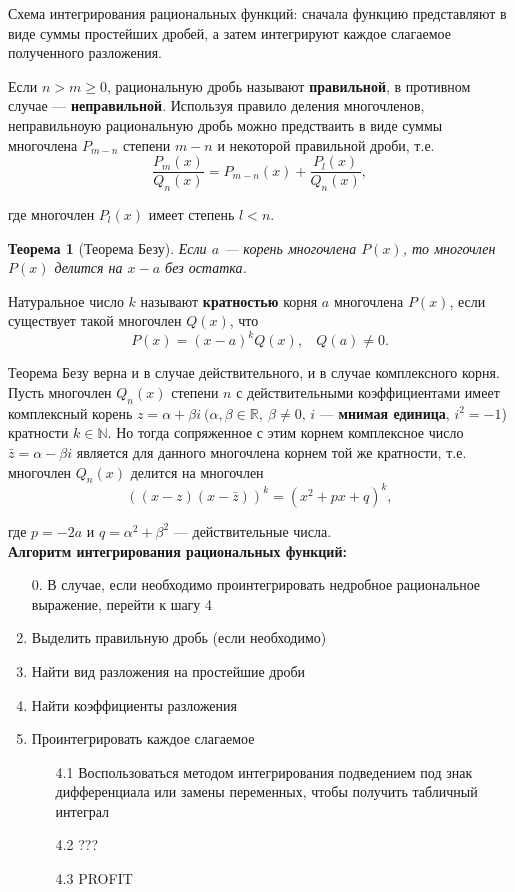 \documentclass[12pt]{report}
\numberwithin{equation}{section}
\newtheorem{theorem}{Теорема}[section]
\begin{document}
Схема интегрирования рациональных функций: сначала функцию представляют в виде суммы простейших дробей, а затем интегрируют каждое слагаемое полученного разложения.

Если $n > m \geqslant 0$,  рациональную дробь называют \textbf{правильной}, в противном случае --- \textbf{неправильной}. Используя правило деления многочленов, неправильноую рациональную дробь можно предстваить в виде суммы многочлена $P_{m-n}$ степени  $m-n$ и некоторой правильной дроби, т.е.
\[ \frac{P_m(x)}{Q_n(x)} = P_{m-n}(x) + \frac{P_l(x)}{Q_n(x)},\]

где многочлен $P_l(x)$ имеет степень $l < n$.

\begin{theorem}[Теорема Безу]
Если $a$ --- корень многочлена $P(x)$, то многочлен $P(x)$ делится на $x-a$ без остатка.
\end{theorem}
 
Натуральное число $k$ называют \textbf{кратностью} корня $a$ многочлена $P(x)$, если существует такой многочлен $Q(x)$, что
\[ P(x) = (x-a)^k Q(x),~~~~Q(a) \neq 0.\]

Теорема Безу верна и в случае действительного, и в случае комплексного корня. Пусть многочлен $Q_n(x)$ степени $n$ с действительными коэффициентами имеет комплексный корень $z = \alpha + \beta i~(\alpha, \beta \in \mathbb{R},~\beta \neq 0$, $i$ --- \textbf{мнимая единица}, $i^2 = -1$) кратности $k \in \mathbb{N}$. Но тогда сопряженное с этим корнем комплексное число $\bar{z} = \alpha - \beta i$ является для данного многочлена корнем той же кратности, т.е. многочлен $Q_n(x)$ делится на многочлен
\[ ((x-z)(x-\bar{z}))^k = (x^2 + px + q)^k,\]

где $p = -2a$ и $q = \alpha^2 + \beta^2$ --- действительные числа.\\

\textbf{Алгоритм интегрирования рациональных функций:}

\begin{enumerate}
\item [0.] В случае, если необходимо проинтегрировать недробное рациональное выражение, перейти к шагу 4
\item Выделить правильную дробь (если необходимо)
\item Найти вид разложения на простейшие дроби
\item Найти коэффициенты разложения
\item Проинтегрировать каждое слагаемое
    \begin{enumerate}
    \item [4.1] Воспользоваться методом интегрирования подведением под знак дифференциала или замены переменных, чтобы получить табличный интеграл
    \item [4.2] ???
    \item [4.3] PROFIT
    \end{enumerate}
\end{enumerate}
\end{document}
